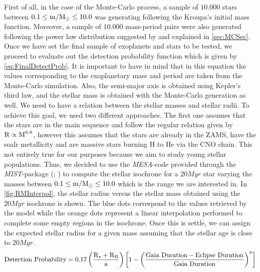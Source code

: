 First of all, in the case of the Monte-Carlo process, a sample of $10.000$ stars between $0.1 \leq \textnormal{m/M$_\odot$} \leq 10.0$ was generating following the Kroupa's initial mass function. Moreover, a sample of $10.000$ mass-period pairs were also generated following the power law distribution suggested by \citeyear{2010EAS....41..107N} and explained in \autoref{sec:MCSec}. Once we have set the final sample of exoplanets and stars to be tested, we proceed to evaluate out the detection probability function which is given by \autoref{eq:FinalDetectProb}. It is important to have in mind that in this equation the values corresponding to the exoplanetary mass and period are taken from the Monte-Carlo simulation. Also, the semi-major axis is obtained using Kepler's third law, and the stellar mass is obtained with the Monte-Carlo generation as well. We need to have a relation between the stellar masses and stellar radii. To achieve this goal, we used two different approaches. The first one assumes that the stars are in the main sequence and follow the regular relation given by $\textnormal{R} \propto \textnormal{M}^{0.8}$, however this assumes that the stars are already in the ZAMS, have the soalr metallicity and are massive stars burning H to He via the CNO chain. This not entirely true for our purposes because we aim to study young stellar populations. Thus, we decided to use the \textit{MESA}-code provided through the \textit{MIST}-package (\citeyear{2016ApJS..222....8D}; \citeyear{2016ApJ...823..102C}) to compute the stellar isochrone for a $20Myr$ star varying the masses between $0.1 \leq \textnormal{m/M$_\odot$} \leq 10.0$ which is the range we are interested in. In \autoref{fig:RMInterpol}, the stellar radius versus the stellar mass obtained using the $20Myr$ isochrone is shown. The blue dots correspond to the values retrieved by the model while the orange dots represent a linear interpolation performed to complete some empty regions in the isochrone. Once this is settle, we can assign the expected stellar radius for a given mass assuming that the stellar age is close to $20Myr$.\\ 

\begingroup
\large
\begin{equation}
  \textnormal{Detection Probability} = 0.17 \left(\frac{\textnormal{R}_\star + \textnormal{R}_\textnormal{H}}{\textnormal{a}} \right) \left[ 1 - \left( \frac{\textnormal{Gaia}~\textnormal{Duration} - \textnormal{Eclipse}~\textnormal{Duration}}{\textnormal{Gaia}~\textnormal{Duration}} \right)^\textnormal{n} \right]
 \label{eq:FinalDetectProb}
\end{equation}
\endgroup \\


